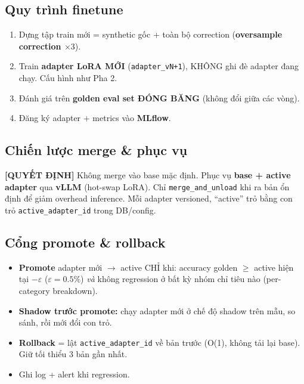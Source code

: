 \documentclass[11pt,a4paper]{article}
\newcommand{\dec}[1]{\textbf{\color{fsgreen!60!black}[QUYẾT ĐỊNH]} #1}
\begin{document}
\subsection{Quy trình finetune}
\begin{enumerate}
  \item Dựng tập train mới = synthetic gốc + toàn bộ correction (\textbf{oversample correction $\times 3$}).
  \item Train \textbf{adapter LoRA MỚI} (\texttt{adapter\_vN+1}), KHÔNG ghi đè adapter đang chạy. Cấu hình như Pha 2.
  \item Đánh giá trên \textbf{golden eval set ĐÓNG BĂNG} (không đổi giữa các vòng).
  \item Đăng ký adapter + metrics vào \textbf{MLflow}.
\end{enumerate}

\subsection{Chiến lược merge \& phục vụ}
\begin{quyetdinh}
\dec{} Không merge vào base mặc định. Phục vụ \textbf{base + active adapter} qua \textbf{vLLM} (hot-swap LoRA). Chỉ \texttt{merge\_and\_unload} khi ra bản ổn định để giảm overhead inference. Mỗi adapter versioned, ``active'' trỏ bằng con trỏ \texttt{active\_adapter\_id} trong DB/config.
\end{quyetdinh}

\subsection{Cổng promote \& rollback}
\begin{itemize}
  \item \textbf{Promote} adapter mới $\rightarrow$ active CHỈ khi: accuracy golden $\geq$ active hiện tại $- \varepsilon$ (\textbf{$\varepsilon=0.5\%$}) \emph{và} không regression ở bất kỳ nhóm chỉ tiêu nào (per-category breakdown).
  \item \textbf{Shadow trước promote:} chạy adapter mới ở chế độ shadow trên mẫu, so sánh, rồi mới đổi con trỏ.
  \item \textbf{Rollback} = lật \texttt{active\_adapter\_id} về bản trước (O(1), không tải lại base). Giữ tối thiểu 3 bản gần nhất.
  \item Ghi log + alert khi regression.
\end{itemize}

\end{document}
